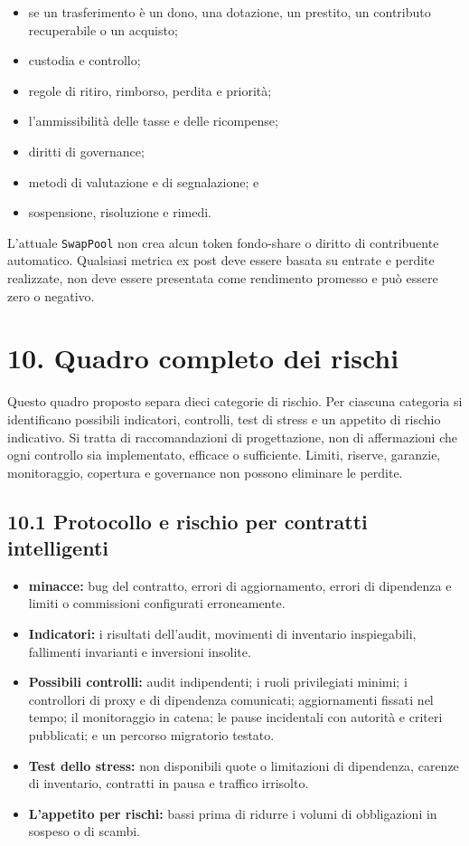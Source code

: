 \documentclass[11pt]{article}
\begin{document}
\begin{itemize}[leftmargin=*]
\item se un trasferimento è un dono, una dotazione, un prestito, un contributo recuperabile o un acquisto;
\item custodia e controllo;
\item regole di ritiro, rimborso, perdita e priorità;
\item l'ammissibilità delle tasse e delle ricompense;
\item diritti di governance;
\item metodi di valutazione e di segnalazione; e
\item sospensione, risoluzione e rimedi.
\end{itemize}
L'attuale \texttt{SwapPool} non crea alcun token fondo-share o diritto di contribuente automatico. Qualsiasi metrica ex post deve essere basata su entrate e perdite realizzate, non deve essere presentata come rendimento promesso e può essere zero o negativo.


\section*{10. Quadro completo dei rischi}

Questo quadro proposto separa dieci categorie di rischio. Per ciascuna categoria si identificano possibili indicatori, controlli, test di stress e un appetito di rischio indicativo. Si tratta di raccomandazioni di progettazione, non di affermazioni che ogni controllo sia implementato, efficace o sufficiente. Limiti, riserve, garanzie, monitoraggio, copertura e governance non possono eliminare le perdite.

\subsection*{10.1 Protocollo e rischio per contratti intelligenti}

\begin{itemize}[leftmargin=*]
\item \textbf{minacce:} bug del contratto, errori di aggiornamento, errori di dipendenza e limiti o commissioni configurati erroneamente.
\item \textbf{Indicatori:} i risultati dell'audit, movimenti di inventario inspiegabili, fallimenti invarianti e inversioni insolite.
\item \textbf{Possibili controlli:} audit indipendenti; i ruoli privilegiati minimi; i controllori di proxy e di dipendenza comunicati; aggiornamenti fissati nel tempo; il monitoraggio in catena; le pause incidentali con autorità e criteri pubblicati; e un percorso migratorio testato.
\item \textbf{Test dello stress:} non disponibili quote o limitazioni di dipendenza, carenze di inventario, contratti in pausa e traffico irrisolto.
\item \textbf{L'appetito per rischi:} bassi prima di ridurre i volumi di obbligazioni in sospeso o di scambi.
\end{itemize}
\end{document}
